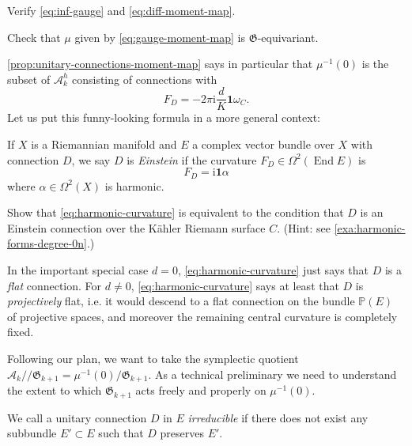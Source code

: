 \documentclass[12pt,letterpaper,reqno]{article}
\numberwithin{equation}{section}
\newcommand{\fG}{{\mathfrak G}}
\newcommand{\cA}{\ensuremath{\mathcal A}}
\newcommand{\PP}{\ensuremath{\mathbb P}}
\newcommand{\kahler}{K\"ahler\xspace}
\newcommand{\kq}{/\!\!/}
\newcommand{\I}{{\mathrm i}}
\newcommand\bid{{\mathbf 1}}
\newcommand{\ti}[1]{\textit{#1}}
\DeclareMathOperator{\End}{End}
\begin{document}
\begin{exercise}
Verify \eqref{eq:inf-gauge} and \eqref{eq:diff-moment-map}.
\end{exercise}

\begin{exercise}
Check that $\mu$ given by \eqref{eq:gauge-moment-map}
is $\fG$-equivariant.
\end{exercise}

\autoref{prop:unitary-connections-moment-map} says in particular that
$\mu^{-1}(0)$ is the subset of $\cA^h_k$
consisting of connections with
\begin{equation} \label{eq:harmonic-curvature}
  F_D = -2 \pi \I \frac{d}{K} \bid \omega_C.
\end{equation}
Let us put this funny-looking formula in a more general context:

\begin{defn}
If $X$ is a Riemannian manifold and $E$ a complex
vector bundle over $X$ with connection $D$, we say $D$ is
\ti{Einstein} if the curvature $F_D \in \Omega^2(\End E)$
is
\begin{equation}
  F_D = \I \bid \alpha
\end{equation}
where $\alpha \in \Omega^2(X)$ is harmonic.
\end{defn}

\begin{exercise} Show that \eqref{eq:harmonic-curvature}
is equivalent to the condition that $D$ is an Einstein
connection over the \kahler Riemann surface $C$.
(Hint: see \autoref{exa:harmonic-forms-degree-0n}.)
\end{exercise}

In the important special case $d=0$, \eqref{eq:harmonic-curvature}
just says that $D$ is a \ti{flat} connection.
For $d \neq 0$, \eqref{eq:harmonic-curvature} says at least that $D$ is
\ti{projectively} flat, i.e. it would descend to a flat connection
on the bundle $\PP(E)$ of projective spaces, and moreover the remaining
central curvature is completely fixed.

Following our plan,
we want to take the symplectic quotient $\cA_k \kq \fG_{k+1} = \mu^{-1}(0) / \fG_{k+1}$.
As a technical preliminary we need to understand the extent to
which $\fG_{k+1}$ acts freely and properly on $\mu^{-1}(0)$.

\begin{defn}
We call a unitary connection $D$ in $E$ \ti{irreducible} if there does not
exist any subbundle $E' \subset E$ such that $D$ preserves $E'$.
\end{defn}
\end{document}

